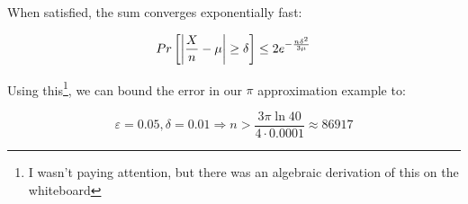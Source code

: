\documentclass[a4paper]{article}
\DeclarePairedDelimiter\abs{\lvert}{\rvert}
\begin{document}
When satisfied, the sum converges exponentially fast:

\[Pr\left[ \abs*{\frac{X}{n}-\mu} \ge \delta \right] \le 2e^{-\frac{n\delta^2}{3\mu}}\]

Using this\footnote{I wasn't paying attention, but there was an algebraic derivation of this on the whiteboard}, we can bound the error in our $\pi$ approximation example to:

\[\varepsilon=0.05, \delta=0.01 \Rightarrow n > \frac{3\pi \ln 40}{4 \cdot 0.0001} \approx 86917\]
\end{document}
